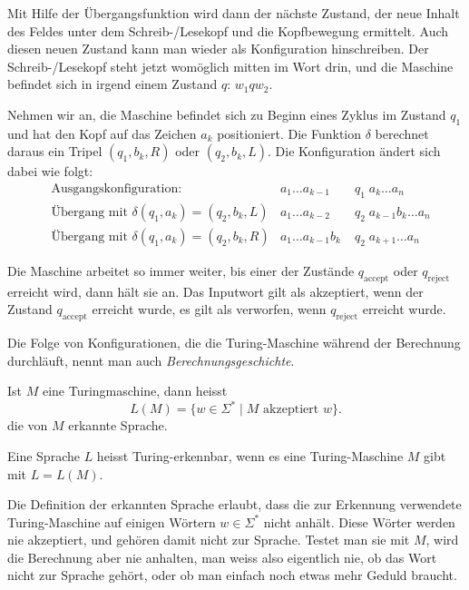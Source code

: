 Mit Hilfe der Übergangsfunktion wird dann der nächste Zustand,
der neue Inhalt des Feldes unter dem Schreib-/Lesekopf und die
Kopfbewegung ermittelt. Auch diesen neuen Zustand kann man wieder
als Konfiguration hinschreiben. Der Schreib-/Lesekopf steht
jetzt womöglich mitten im Wort drin, und die Maschine befindet
sich in irgend einem Zustand $q$: $w_1qw_2$.

Nehmen wir an, die Maschine befindet sich zu Beginn eines Zyklus im
Zustand $q_1$ und hat den Kopf auf das Zeichen $a_k$ positioniert.
Die Funktion $\delta$ berechnet daraus ein Tripel $(q_1,b_k,R)$
oder $(q_2,b_k,L)$. Die Konfiguration ändert sich dabei wie
folgt:
\begin{align*}
&\text{Ausgangskonfiguration:}&a_1\dots a_{k-1}&\;q_1\;a_k\dots a_n\\
&\text{Übergang mit } \delta(q_1,a_k)=(q_2,b_k,L)&a_1\dots a_{k-2}&\;q_2\;a_{k-1}b_k\dots a_n\\
&\text{Übergang mit } \delta(q_1,a_k)=(q_2,b_k,R)&a_1\dots a_{k-1}b_k&\;q_2\;a_{k+1}\dots a_n
\end{align*}

Die Maschine arbeitet so immer weiter, bis einer der Zustände $q_{\text{accept}}$
oder $q_{\text{reject}}$ erreicht wird, dann hält sie an.
Das Inputwort gilt als akzeptiert, wenn der Zustand $q_{\text{accept}}$
erreicht wurde, es gilt als verworfen, wenn $q_{\text{reject}}$ erreicht
wurde.

Die Folge von Konfigurationen, die die Turing-Maschine
während der Berechnung durchläuft, nennt man auch
{\em Berechnungsgeschichte}.

\begin{definition}
Ist $M$ eine Turingmaschine, dann heisst
\[
L(M)=\{w\in\Sigma^*\;|\;\text{$M$ akzeptiert $w$}\}.
\]
die von $M$ erkannte Sprache.
\end{definition}

\begin{definition}
Eine Sprache $L$ heisst Turing-erkennbar, wenn es eine Turing-Maschine
$M$ gibt mit $L=L(M)$.
\end{definition}

Die Definition der erkannten Sprache erlaubt, dass die zur Erkennung
verwendete Turing-Maschine auf einigen Wörtern $w\in\Sigma^*$ nicht
anhält. Diese Wörter werden nie akzeptiert, und gehören
damit nicht zur Sprache. Testet man sie mit $M$, wird die Berechnung
aber nie anhalten, man weiss also eigentlich nie, ob das Wort
nicht zur Sprache gehört, oder ob man einfach noch etwas mehr
Geduld braucht.

